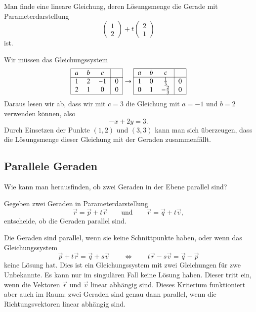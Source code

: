 \begin{beispiel}
Man finde eine lineare Gleichung, deren Lösungsmenge die Gerade mit
Parameterdarstellung
\[
\begin{pmatrix} 1\\2\end{pmatrix} + t\begin{pmatrix}2\\1\end{pmatrix}
\]
ist.
\smallskip

Wir müssen das Gleichungssystem
\[
\begin{tabular}{|>{$}c<{$}>{$}c<{$}>{$}c<{$}|>{$}c<{$}|}
\hline
a&b&c&\\
\hline
1&2&-1&0\\
2&1&0&0\\
\hline
\end{tabular}
\rightarrow
\begin{tabular}{|>{$}c<{$}>{$}c<{$}>{$}c<{$}|>{$}c<{$}|}
\hline
a&b&c&\\
\hline
1&0& \frac13&0\\
0&1&-\frac23&0\\
\hline
\end{tabular}
\]
Daraus lesen wir ab, dass wir mit $c=3$ die Gleichung mit $a=-1$ und $b=2$
verwenden können, also
\[
-x+2y=3.
\]
Durch Einsetzen der Punkte $(1,2)$ und $(3,3)$ kann man sich überzeugen,
dass die Lösungsmenge dieser Gleichung mit der Geraden zusammenfällt.
\qedhere
\end{beispiel}

%
%
\subsection{Parallele Geraden}
Wie kann man herausfinden, ob zwei Geraden in der Ebene parallel sind?

\begin{aufgabe}
Gegeben zwei Geraden in Parameterdarstellung
\[
\vec{r} = \vec{p} + t\vec{r}
\qquad\text{und}\qquad
\vec{r} = \vec{q} + t\vec{v},
\]
entscheide, ob die Geraden parallel sind.
\end{aufgabe}
Die Geraden sind parallel, wenn sie keine Schnittpunkte haben, oder
wenn das Gleichungssystem
\[
\vec{p} + t\vec{r}
=
\vec{q} + s\vec{v}
\qquad\Leftrightarrow\qquad
t\vec{r}
-
s\vec{v}
=
\vec{q}
-
\vec{p}
\]
keine Lösung hat.
Dies ist ein Gleichungssystem mit zwei Gleichungen für zwe Unbekannte.
Es kann nur im singulären Fall keine Lösung haben.
Dieser tritt ein, wenn die Vektoren $\vec{r}$ und $\vec{v}$
linear abhängig sind.
Dieses Kriterium funktioniert aber auch im Raum: zwei Geraden sind
genau dann parallel, wenn die Richtungsvektoren linear abhängig sind.

